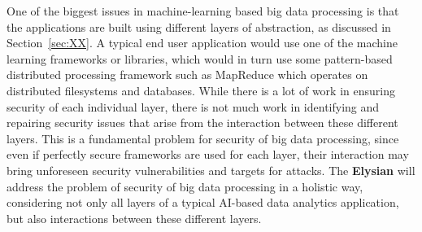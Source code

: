 \documentclass[a4paper,11pt]{article}
\newcommand{\project}[1]{\textbf{#1}\xspace}
\newcommand{\SECURITY}{\project{Elysian}}
\newcommand{\TheProject}{\SECURITY}
\begin{document}
One of the biggest issues in machine-learning based big data processing is that the applications are built using different layers of abstraction, as discussed in Section~\ref{sec:XX}. A typical end user application would use one of the machine learning frameworks or libraries, which would in turn use some pattern-based distributed processing framework such as MapReduce which operates on distributed filesystems and databases. While there is a lot of work in ensuring security of each individual layer, there is not much work in identifying and repairing security issues that arise from the interaction between these different layers. This is a fundamental problem for security of big data processing, since even if perfectly secure frameworks are used for each layer, their interaction may bring unforeseen security vulnerabilities and targets for attacks. The \TheProject{} will address the problem of security of big data processing in a holistic way, considering not only all layers of a typical AI-based data analytics application, but also interactions between these different layers.

 
\end{document}
